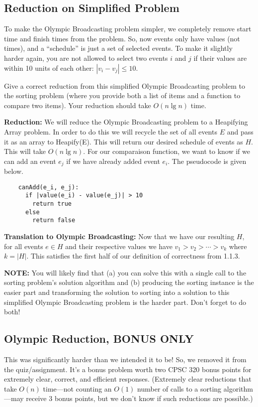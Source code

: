 \documentclass[11pt, oneside]{article}   	%
\theoremstyle{definition}
\theoremstyle{remark}
\begin{document}
\subsection{Reduction on Simplified Problem}

To make the Olympic Broadcasting problem simpler, we completely remove
start time and finish times from the problem. So, now events only have
values (not times), and a ``schedule'' is just a set of selected
events. To make it slightly harder again, you are not allowed to
select two events $i$ and $j$ if their values are within 10 units of
each other: $|v_i - v_j| \leq 10$.

Give a correct reduction from this simplified Olympic Broadcasting
problem to the sorting problem (where you provide both a list of items
and a function to compare two items). Your reduction should take $O(n
\lg n)$ time.

\textbf{Reduction: } We will reduce the Olympic Broadcasting problem to a Heapifying Array problem. In order to do this we will recycle the set of all events $E$ and pass it as an array to Heapify(E). This will return our desired schedule of events as $H$. This will take $O(n \lg n)$. For our comparaison function, we want to know if we can add an event $e_j$ if we have already added event $e_i$. The pseudocode is given below.

\begin{verbatim}
	canAdd(e_i, e_j):
	  if |value(e_i) - value(e_j)| > 10
	    return true
	  else
	    return false	
\end{verbatim} 

\textbf{Translation to Olympic Broadcasting: } Now that we have our resulting $H$, for all events $e \in H$ and their respective values we have $v_1 > v_2 > \dotsm> v_k$ where $k =|H|$. This satisfies the first half of our definition of correctness from 1.1.3. 

\textbf{NOTE:} You will likely find that (a) you can solve this with a single
call to the sorting problem's solution algorithm and (b) producing the
sorting instance is the easier part and transforming the solution to
sorting into a solution to this simplified Olympic Broadcasting
problem is the harder part. Don't forget to do both!
\subsection{Olympic Reduction, BONUS ONLY}

This was significantly harder than we intended it to be! So, we
removed it from the quiz/assignment. It's a bonus problem worth two
CPSC 320 bonus points for extremely clear, correct, and efficient
responses. (Extremely clear reductions that take $O(n)$ time---not
counting an $O(1)$ number of calls to a sorting algorithm---may
receive 3 bonus points, but we don't know if such reductions are
possible.)
\end{document}
